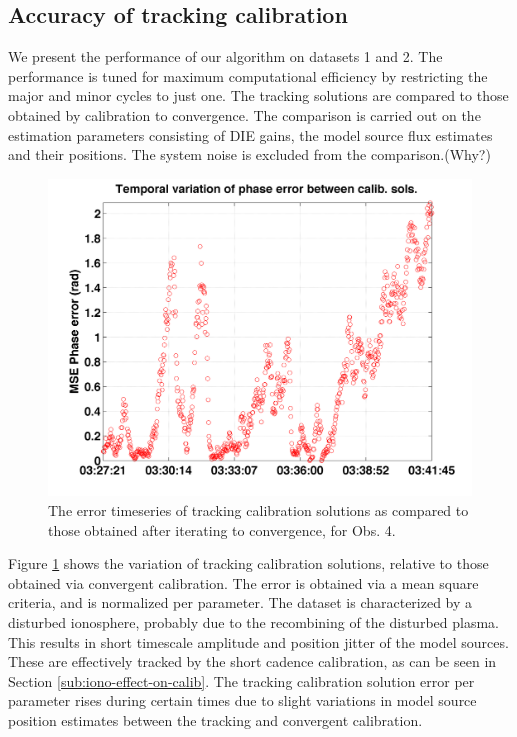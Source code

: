 \documentclass{aa}
\begin{document}
\subsection{Accuracy of tracking calibration}

We present the performance of our algorithm on datasets 1 and 2. The performance
is tuned for maximum computational efficiency by restricting the major and minor
cycles to  just one. The  tracking solutions are  compared to those  obtained by
calibration  to convergence.  The comparison  is carried  out on  the estimation
parameters consisting  of DIE gains, the  model source flux  estimates and their
positions. The system noise is excluded from the comparison.(Why?)

\begin{figure}[tbh]
\includegraphics[width=1\columnwidth]{Figs/cmpcalsol}
\caption{\label{fig:The-error-timeseries}The error timeseries of tracking
calibration solutions as compared to those obtained after iterating
to convergence, for Obs. 4.}
\end{figure}


Figure   \ref{fig:The-error-timeseries}   shows   the  variation   of   tracking
calibration solutions,  relative to  those obtained via  convergent calibration.
The  error  is obtained  via  a  mean square  criteria,  and  is normalized  per
parameter. The dataset is characterized  by a disturbed ionosphere, probably due
to  the recombining of  the disturbed  plasma. This  results in  short timescale
amplitude  and position  jitter of  the  model sources.   These are  effectively
tracked  by  the   short  cadence  calibration,  as  can   be  seen  in  Section
\ref{sub:iono-effect-on-calib}.  The  tracking  calibration solution  error  per
parameter rises  during certain times due  to slight variations  in model source
position estimates between the tracking and convergent calibration.
\end{document}
